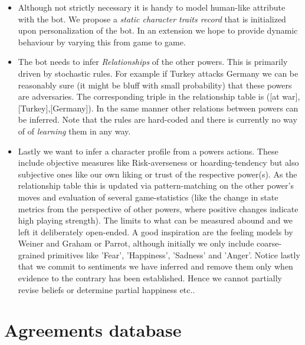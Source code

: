 \documentclass[pdftex,11pt,a4paper]{report}
\begin{document}
\begin{itemize}

\item Although not strictly necessary it is handy to model
      human-like attribute with the bot. We propose a
      \textit{static character traits record} that is 
      initialized upon personalization of the bot. In an 
      extension we hope to provide dynamic behaviour by
      varying this from game to game.

\item The bot needs to infer \textit{Relationships} of the
      other powers. This is primarily driven by stochastic rules.
      For example if Turkey attacks Germany we can be reasonably 
      sure (it might be bluff with small probability) that these
      powers are adversaries. The corresponding triple in the
      relationship table is ([at war],[Turkey],[Germany]). In the  
      same manner other relations between powers can be inferred. 
      Note that the rules are hard-coded and there is currently
      no way of of \textit{learning} them in any way.

\item Lastly we want to infer a character profile from a powers actions.
      These include objective measures like Risk-averseness or 
      hoarding-tendency but also subjective ones like our own 
      liking or trust of the respective power(s). As the relationship table this
      is updated via pattern-matching on the other power's moves and
      evaluation of several game-statistics (like the change in 
      state metrics from the perspective of other powers, where positive
      changes indicate high playing strength). The limits to what can
      be measured abound and we left it deliberately open-ended. A good
      inspiration are the feeling models by Weiner and Graham or 
      Parrot, although initially we only include coarse-grained primitives
      like  'Fear', 'Happiness', 'Sadness' and 'Anger'. Notice lastly that
      we commit to sentiments we have inferred and remove them only 
      when evidence to the contrary has been established. Hence we cannot
      partially revise beliefs or determine partial happiness etc..

\end{itemize}

\section{Agreements database}
\end{document}

